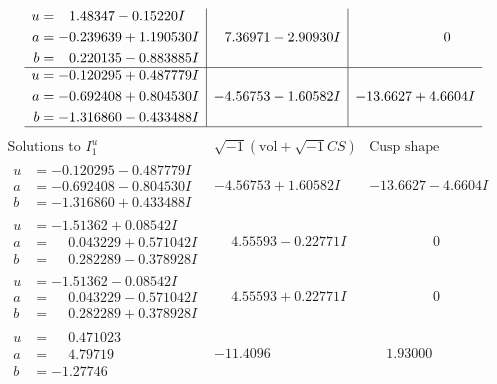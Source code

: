 \documentclass[1p]{elsarticle_modified}
\theoremstyle{definition}
\newcommand{\I}{\sqrt{-1}}
\begin{document}
$$\begin{array}{c|c|c}
\begin{aligned}
u &= \phantom{-}1.48347 - 0.15220 I \\
a &= -0.239639 + 1.190530 I \\
b &= \phantom{-}0.220135 - 0.883885 I\end{aligned}
 & \phantom{-}7.36971 - 2.90930 I & \phantom{-0.000000 } 0 \\ \hline\begin{aligned}
u &= -0.120295 + 0.487779 I \\
a &= -0.692408 + 0.804530 I \\
b &= -1.316860 - 0.433488 I\end{aligned}
 & -4.56753 - 1.60582 I & -13.6627 + 4.6604 I\\
 \hline 
 \end{array}$$\newpage$$\begin{array}{c|c|c}  
\text{Solutions to }I^u_{1}& \I (\text{vol} + \sqrt{-1}CS) & \text{Cusp shape}\\
 \hline 
\begin{aligned}
u &= -0.120295 - 0.487779 I \\
a &= -0.692408 - 0.804530 I \\
b &= -1.316860 + 0.433488 I\end{aligned}
 & -4.56753 + 1.60582 I & -13.6627 - 4.6604 I \\ \hline\begin{aligned}
u &= -1.51362 + 0.08542 I \\
a &= \phantom{-}0.043229 + 0.571042 I \\
b &= \phantom{-}0.282289 - 0.378928 I\end{aligned}
 & \phantom{-}4.55593 - 0.22771 I & \phantom{-0.000000 } 0 \\ \hline\begin{aligned}
u &= -1.51362 - 0.08542 I \\
a &= \phantom{-}0.043229 - 0.571042 I \\
b &= \phantom{-}0.282289 + 0.378928 I\end{aligned}
 & \phantom{-}4.55593 + 0.22771 I & \phantom{-0.000000 } 0 \\ \hline\begin{aligned}
u &= \phantom{-}0.471023\phantom{ +0.000000I} \\
a &= \phantom{-}4.79719\phantom{ +0.000000I} \\
b &= -1.27746\phantom{ +0.000000I}\end{aligned}
 & -11.4096\phantom{ +0.000000I} & \phantom{-}1.93000\phantom{ +0.000000I} \\ \hline\begin{aligned}

\end{aligned}
\end{array}$$
\end{document}
